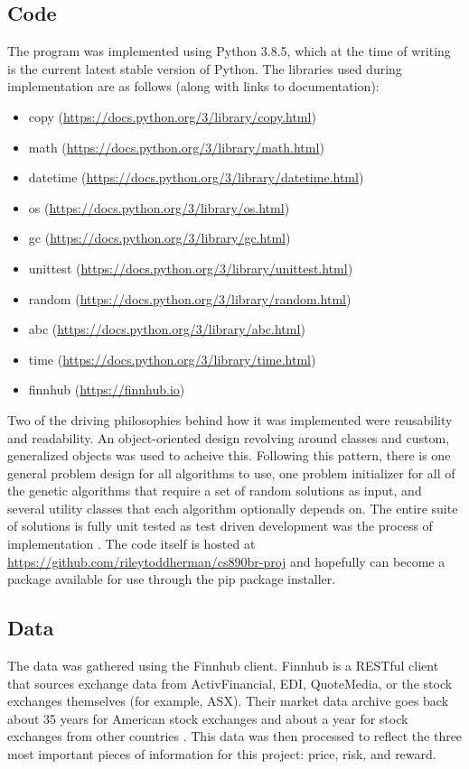 \documentclass{article}
\begin{document}
    \subsection{Code}
    The program was implemented using Python 3.8.5, which at the time of writing is the current latest stable version of Python. The libraries used during 
    implementation are as follows (along with links to documentation):
    \begin{itemize}
        \item copy (\url{https://docs.python.org/3/library/copy.html})
        \item math (\url{https://docs.python.org/3/library/math.html})
        \item datetime (\url{https://docs.python.org/3/library/datetime.html})
        \item os (\url{https://docs.python.org/3/library/os.html})
        \item gc (\url{https://docs.python.org/3/library/gc.html})
        \item unittest (\url{https://docs.python.org/3/library/unittest.html})
        \item random (\url{https://docs.python.org/3/library/random.html})
        \item abc (\url{https://docs.python.org/3/library/abc.html})
        \item time (\url{https://docs.python.org/3/library/time.html})
        \item finnhub (\url{https://finnhub.io})
    \end{itemize}
    Two of the driving philosophies behind how it was implemented were reusability and readability. An object-oriented design revolving around classes and 
    custom, generalized objects was used to acheive this. Following this pattern, there is one general problem design for all algorithms to use, one 
    problem initializer for all of the genetic algorithms that require a set of random solutions as input, and several utility classes that each algorithm
    optionally depends on. \cite{ReillyRalstonHemmendinger} The entire suite of solutions is fully unit tested as test driven development was the process of 
    implementation \cite{Beck}. The code itself is hosted at \url{https://github.com/rileytoddherman/cs890br-proj} and hopefully can become a package available 
    for use through the pip package installer.
    \subsection{Data}
    The data was gathered using the Finnhub client. Finnhub is a RESTful client that sources exchange data from ActivFinancial, EDI, QuoteMedia, or the stock 
    exchanges themselves (for example, ASX). Their market data archive goes back about 35 years for American stock exchanges and about a year for stock exchanges
    from other countries \cite{Finnhub} \cite{Allamaraju}. This data was then processed to reflect the three most important pieces of information for this project: 
    price, risk, and reward.
\end{document}
